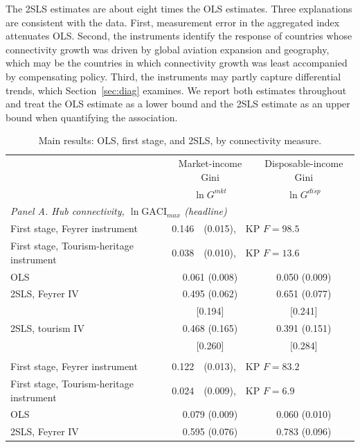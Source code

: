 The 2SLS estimates are about eight times the OLS estimates. Three explanations are consistent with the data. First, measurement error in the aggregated index attenuates OLS. Second, the instruments identify the response of countries whose connectivity growth was driven by global aviation expansion and geography, which may be the countries in which connectivity growth was least accompanied by compensating policy. Third, the instruments may partly capture differential trends, which Section~\ref{sec:diag} examines. We report both estimates throughout and treat the OLS estimate as a lower bound and the 2SLS estimate as an upper bound when quantifying the association.

\begin{table}[H]\centering\caption{Main results: OLS, first stage, and 2SLS, by connectivity measure.}\label{tab:main}
\begin{threeparttable}\small\begin{tabular}{lcc}
\toprule
 & Market-income Gini & Disposable-income Gini \\
 & $\ln G^{mkt}$ & $\ln G^{disp}$ \\
\midrule
\multicolumn{3}{l}{\emph{Panel A. Hub connectivity, $\ln\mathrm{GACI}_{max}$ (headline)}}\\
First stage, Feyrer instrument & \multicolumn{2}{l}{0.146\sym{***}\ \ (0.015),\ \ KP $F=98.5$} \\
First stage, Tourism-heritage instrument & \multicolumn{2}{l}{0.038\sym{***}\ \ (0.010),\ \ KP $F=13.6$} \\
OLS & 0.061\sym{***} (0.008) & 0.050\sym{***} (0.009) \\
2SLS, Feyrer IV & 0.495\sym{***} (0.062) & 0.651\sym{***} (0.077) \\
 & [0.194]\sym{**} & [0.241]\sym{***} \\
2SLS, tourism IV & 0.468\sym{***} (0.165) & 0.391\sym{***} (0.151) \\
 & [0.260]\sym{*} & [0.284] \\
\addlinespace
\multicolumn{3}{l}{\emph{Panel B. Hub quality, $\ln\mathrm{GACI}_{cwm}$}}\\
First stage, Feyrer instrument & \multicolumn{2}{l}{0.122\sym{***}\ \ (0.013),\ \ KP $F=83.2$} \\
First stage, Tourism-heritage instrument & \multicolumn{2}{l}{0.024\sym{***}\ \ (0.009),\ \ KP $F=6.9$} \\
OLS & 0.079\sym{***} (0.009) & 0.060\sym{***} (0.010) \\
2SLS, Feyrer IV & 0.595\sym{***} (0.076) & 0.783\sym{***} (0.096) \\

\end{tabular}
\end{threeparttable}
\end{table}
